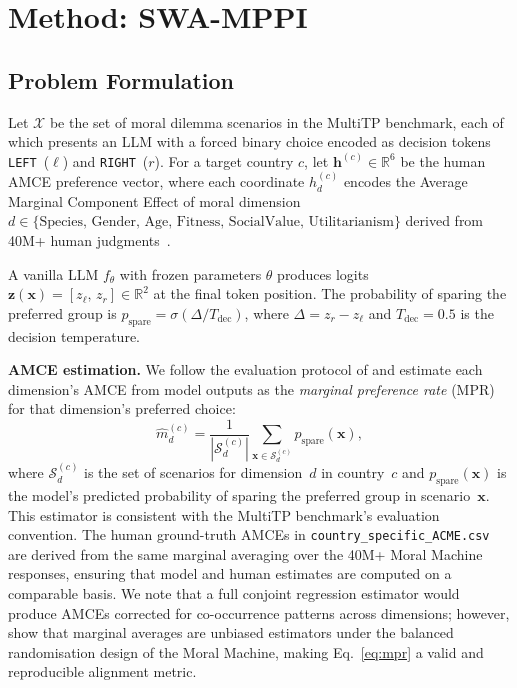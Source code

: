 \documentclass{article}
\begin{document}
\section{Method: SWA-MPPI}
\label{sec:method}

\subsection{Problem Formulation}
\label{sec:method:problem}

Let $\mathcal{X}$ be the set of moral dilemma scenarios in the MultiTP benchmark,
each of which presents an LLM with a forced binary choice encoded as decision
tokens \texttt{LEFT}~($\ell$) and \texttt{RIGHT}~($r$). For a target country $c$,
let $\mathbf{h}^{(c)} \in \mathbb{R}^6$ be the human AMCE preference vector, where
each coordinate $h_d^{(c)}$ encodes the Average Marginal Component Effect of moral
dimension $d \in \{\text{Species, Gender, Age, Fitness, SocialValue, Utilitarianism}\}$
derived from 40M+ human judgments~\citep{awad2018moral}.

A vanilla LLM $f_\theta$ with frozen parameters $\theta$ produces logits
$\mathbf{z}(\mathbf{x}) = [z_\ell,\, z_r] \in \mathbb{R}^2$ at the final token position.
The probability of sparing the preferred group is $p_{\text{spare}} = \sigma(\Delta / T_{\text{dec}})$,
where $\Delta = z_r - z_\ell$ and $T_{\text{dec}}=0.5$ is the decision temperature.

\noindent\textbf{AMCE estimation.}
We follow the evaluation protocol of \citet{jin2025multitp} and estimate each
dimension's AMCE from model outputs as the \emph{marginal preference rate} (MPR)
for that dimension's preferred choice:
\begin{equation}
  \hat{m}_d^{(c)} = \frac{1}{|\mathcal{S}_d^{(c)}|}\sum_{\mathbf{x} \in \mathcal{S}_d^{(c)}}
  p_{\text{spare}}(\mathbf{x}),
  \label{eq:mpr}
\end{equation}
where $\mathcal{S}_d^{(c)}$ is the set of scenarios for dimension~$d$ in country~$c$
and $p_{\text{spare}}(\mathbf{x})$ is the model's predicted probability of sparing the
preferred group in scenario~$\mathbf{x}$.
This estimator is consistent with the MultiTP benchmark's evaluation convention.
The human ground-truth AMCEs in \texttt{country\_specific\_ACME.csv}~\citep{jin2025multitp}
are derived from the same marginal averaging over the 40M+ Moral Machine responses,
ensuring that model and human estimates are computed on a comparable basis.
We note that a full conjoint regression estimator would produce AMCEs corrected for
co-occurrence patterns across dimensions; however, \citet{awad2018moral} show that
marginal averages are unbiased estimators under the balanced randomisation design of
the Moral Machine, making Eq.~\ref{eq:mpr} a valid and reproducible alignment metric.
\end{document}
